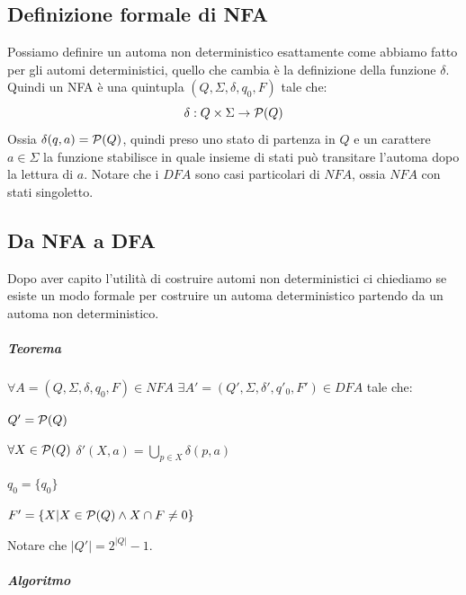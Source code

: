 \subsection{Definizione formale di NFA }
Possiamo definire un automa non deterministico esattamente come abbiamo fatto per gli automi deterministici, quello che cambia \`e la definizione della funzione $\delta$. Quindi un NFA \`e una quintupla $(Q, \Sigma, \delta, q_0, F)$ tale che: 
\[
	\delta : Q \times \Sigma \to {\cal P} (Q)
\]
Ossia $\delta (q,a) ={\cal P} (Q)$, quindi preso uno stato di partenza in $Q$ e un carattere $a \in \Sigma$ la funzione stabilisce in quale insieme di stati pu\`o transitare l'automa dopo la lettura di $a$. \newline
Notare che i $DFA$ sono casi particolari di $NFA$, ossia $NFA$ con stati singoletto.
\subsection{Da NFA a DFA}
Dopo aver capito l'utilit\`a di costruire automi non deterministici ci chiediamo se esiste un modo formale per costruire un automa deterministico partendo da un automa non deterministico.
\subparagraph{Teorema}
$	\forall A = (Q, \Sigma, \delta, q_0, F) \in NFA$ $\exists A'= (Q', \Sigma, \delta', q'_0, F') \in DFA$ tale che:
\begin{description}
	\item $Q' =  {\cal P}(Q)$
	\item $\forall X \in {\cal P}(Q)$ $\delta'(X,a) = \bigcup_{p \in X} \delta(p, a)$
	\item $q_0 = \{q_0\}$
	\item $F' = \{ X | X \in {\cal P}(Q) \land X \cap F \neq 0\}$
\end{description}
Notare che $|Q'| = 2^{|Q|}-1$.
\subparagraph{Algoritmo}
